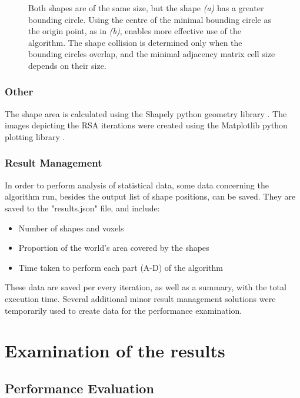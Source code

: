 \documentclass[12pt, oneside]{report}
\begin{document}
\begin{figure}
\caption{Both shapes are of the same size, but the shape \textit{(a)} has a greater bounding circle. Using the centre of the minimal bounding circle as the origin point, as in \textit{(b)}, enables more effective use of the algorithm. The shape collision is determined only when the bounding circles overlap, and the minimal adjacency matrix cell size depends on their size.}
\end{figure}

\subsection{Other}

The shape area is calculated using the Shapely python geometry library \cite{shapely}. \newline
The images depicting the RSA iterations were created using the Matplotlib python plotting library \cite{matplotlib}.

\subsection{Result Management}

In order to perform analysis of statistical data, some data concerning the algorithm run, besides the output list of shape positions, can be saved. They are saved to the "results.json" file, and include:
\begin{itemize}
  \item Number of shapes and voxels
 	\item Proportion of the world's area covered by the shapes
	\item Time taken to perform each part (A-D) of the algorithm
\end{itemize}
These data are saved per every iteration, as well as a summary, with the total execution time. \newline
Several additional minor result management solutions were temporarily used to create data for the performance examination.



\chapter{Examination of the results}
\section{Performance Evaluation}
\end{document}
